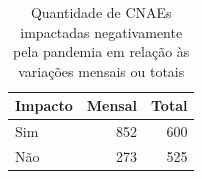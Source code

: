 \begin{table}[htb]
\centering
\caption{Quantidade de CNAEs impactadas negativamente pela pandemia em relação às variações mensais ou totais}
\label{tab:pandemia:impacto-por-cnae}
    \begin{tabular}{l|r|r}
        \toprule
        Impacto & Mensal & Total \\
        \midrule
        Sim & 852 & 600 \\
        Não & 273 & 525 \\
        \bottomrule
    \end{tabular}
\fdadospesquisa
\end{table}
